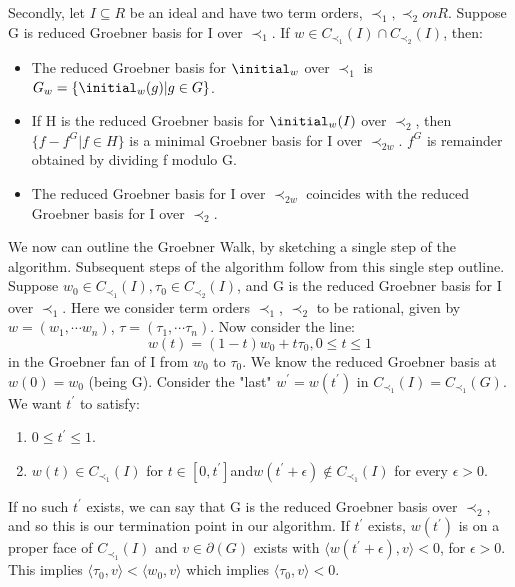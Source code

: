 \documentclass[12pt,a4paper]{report}
\begin{document}
Secondly, let $I \subseteq R$ be an ideal and have two term orders, $\prec_{1}, \prec_{2} on R$. Suppose G is reduced Groebner basis for I over $\prec_{1}$. If $w \in C_{\prec_{1}} (I) \cap C_{\prec_{2}} (I)$, then:

\begin{itemize}
    \item The reduced Groebner basis for $\initial_{w}$ over $\prec_{1}$ is $G_{w} = \{ \initial_{w} (g) | g \in G\}$.
    \item If H is the reduced Groebner basis for $\initial_{w} (I)$ over $\prec_{2}$, then $\{ f - f^{G} | f \in H \}$ is a minimal Groebner basis for I over $\prec_{2w}$. $f^{G}$ is remainder obtained by dividing f modulo G.
    \item The reduced Groebner basis for I over $\prec_{2w}$ coincides with the reduced Groebner basis for I over $\prec_{2}$.
\end{itemize}

We now can outline the Groebner Walk, by sketching a single step of the algorithm. Subsequent steps of the algorithm follow from this single step outline. Suppose $w_{0} \in C_{{\prec}_{1}} (I), \tau_{0} \in C_{{\prec}_{2}} (I)$, and G is the reduced Groebner basis for I over $\prec_{1}$. Here we consider term orders $\prec_{1}$, $\prec_{2}$ to be rational, given by $w = (w_{1}, \cdots w_{n})$, $\tau = (\tau_{1}, \cdots \tau_{n})$. Now consider the line:
\begin{equation*}
    w(t) = (1-t)w_{0} + t \tau_{0}, 0 \leq t \leq 1
\end{equation*}
in the Groebner fan of I from $w_{0}$ to $\tau_{0}$. We know the reduced Groebner basis at $w(0) = w_{0}$ (being G). Consider the "last" $w^{'} = w(t^{'})$ in $C_{{\prec}_{1}} (I) = C_{{\prec}_{1}} (G)$. We want $t^{'}$ to satisfy:

\begin{enumerate}
    \item $0 \leq t^{'} \leq 1$.
    \item $w(t) \in C_{\prec}_{1} (I)$ for $t \in [0, t^{'}] $and$ w(t^{'} + \epsilon) \notin C_{\prec}_{1} (I)$ for every $\epsilon > 0$.
\end{enumerate}

If no such $t^{'}$ exists, we can say that G is the reduced Groebner basis over $\prec_{2}$, and so this is our termination point in our algorithm. If $t^{'}$ exists, $w(t^{'})$ is on a proper face of $C_{{\prec}_{1}} (I)$ and $v \in \partial (G)$ exists with $\langle w (t^{'} + \epsilon), v \rangle < 0$, for $\epsilon > 0$. This implies $\langle \tau_{0}, v \rangle < \langle w_{0}, v \rangle$ which implies $\langle \tau_{0}, v \rangle < 0$.
\end{document}
